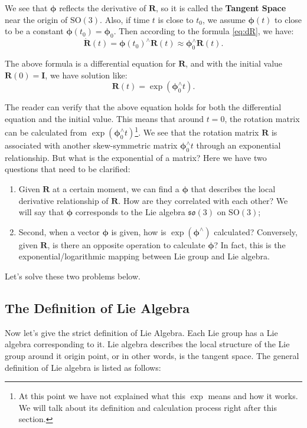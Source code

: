 We see that $\boldsymbol{\phi}$ reflects the derivative of $\mathbf{R}$, so it is called the \textbf{Tangent Space} near the origin of $\mathrm{SO}(3)$. Also, if time $t$ is close to $t_0$, we assume $\boldsymbol{\phi}(t)$ to close to be a constant $\boldsymbol{\phi}(t_0) = \boldsymbol{\phi}_0$. Then according to the formula \eqref{eq:dR}, we have:
\[
\dot{\mathbf{R}} (t) = \boldsymbol{\phi} (t_0) ^ {\wedge} \mathbf{R}(t) \approx \boldsymbol{\phi}_0^ {\wedge} \mathbf {R}(t).
\]

The above formula is a differential equation for $\mathbf{R}$, and with the initial value $\mathbf{R}(0) = \mathbf{I}$, we have solution like:
\begin{equation}
\label{eq:so3ode}
\mathbf{R}(t) = \exp \left( \boldsymbol{\phi}_0^\wedge t \right).
\end{equation}

The reader can verify that the above equation holds for both the differential equation and the initial value. This means that around $t = 0$, the rotation matrix can be calculated from $\exp \left( \boldsymbol{\phi}_0^\wedge t \right)$\footnote{At this point we have not explained what this $\exp$ means and how it works. We will talk about its definition and calculation process right after this section. }. We see that the rotation matrix $\mathbf{R}$ is associated with another skew-symmetric matrix $\boldsymbol{\phi}_0^\wedge t$ through an exponential relationship. But what is the exponential of a matrix? Here we have two questions that need to be clarified:

\begin{enumerate}
    \item Given $\mathbf{R}$ at a certain moment, we can find a $\boldsymbol{\phi}$ that describes the local derivative relationship of $\mathbf{R}$. How are they correlated with each other? We will say that $\boldsymbol{\phi}$ corresponds to the Lie algebra $\mathfrak{so}(3)$ on $\mathrm{SO}(3)$;
    \item Second, when a vector $\boldsymbol{\phi}$ is given, how is $\exp (\boldsymbol{\phi} ^\wedge )$ calculated? Conversely, given $\mathbf{R}$, is there an opposite operation to calculate $\boldsymbol{\phi}$? In fact, this is the exponential/logarithmic mapping between Lie group and Lie algebra.
\end{enumerate}

Let's solve these two problems below.

\subsection{The Definition of Lie Algebra}
Now let's give the strict definition of Lie Algebra. Each Lie group has a Lie algebra corresponding to it. Lie algebra describes the local structure of the Lie group around it origin point, or in other words, is the tangent space. The general definition of Lie algebra is listed as follows:

